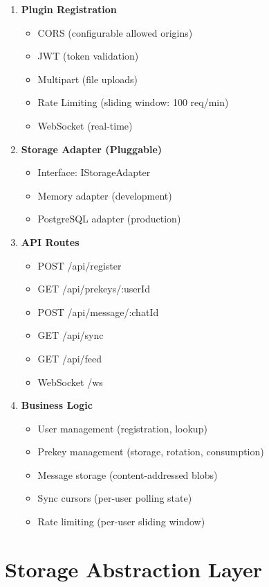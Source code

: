 \documentclass[11pt,a4paper,oneside]{book}
\begin{document}
\begin{enumerate}
  \item \textbf{Plugin Registration}
  \begin{itemize}
    \item CORS (configurable allowed origins)
    \item JWT (token validation)
    \item Multipart (file uploads)
    \item Rate Limiting (sliding window: 100 req/min)
    \item WebSocket (real-time)
  \end{itemize}
  \item \textbf{Storage Adapter (Pluggable)}
  \begin{itemize}
    \item Interface: IStorageAdapter
    \item Memory adapter (development)
    \item PostgreSQL adapter (production)
  \end{itemize}
  \item \textbf{API Routes}
  \begin{itemize}
    \item POST /api/register
    \item GET /api/prekeys/:userId
    \item POST /api/message/:chatId
    \item GET /api/sync
    \item GET /api/feed
    \item WebSocket /ws
  \end{itemize}
  \item \textbf{Business Logic}
  \begin{itemize}
    \item User management (registration, lookup)
    \item Prekey management (storage, rotation, consumption)
    \item Message storage (content-addressed blobs)
    \item Sync cursors (per-user polling state)
    \item Rate limiting (per-user sliding window)
  \end{itemize}
\end{enumerate}
\vspace{-0.3cm}\section{Storage Abstraction Layer}
\end{document}

